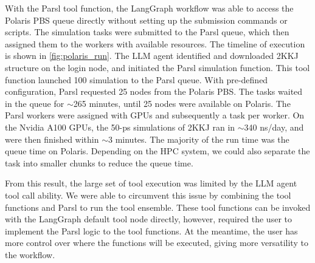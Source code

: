 With the Parsl tool function, the LangGraph workflow was able to access the Polaris PBS queue directly without setting up the submission commands or scripts. 
The simulation tasks were submitted to the Parsl queue, which then assigned them to the workers with available resources.
The timeline of execution is shown in \autoref{fig:polaris_run}. 
The LLM agent identified and downloaded 2KKJ structure on the login node, and initiated the Parsl simulation function. 
This tool function launched 100 simulation to the Parsl queue. 
With pre-defined configuration, Parsl requested 25 nodes from the Polaris PBS. 
The tasks waited in the queue for $\sim$265 minutes, until 25 nodes were available on Polaris. 
The Parsl workers were assigned with GPUs and subsequently a task per worker. 
On the Nvidia A100 GPUs, the 50-ps simulations of 2KKJ ran in $\sim$340 ns/day, and were then finished  within $\sim$3 minutes. 
The majority of the run time was the queue time on Polaris. 
Depending on the HPC system, we could also separate the task into smaller chunks to reduce the queue time. 

From this result, the large set of tool execution was limited by the LLM agent tool call ability. 
We were able to circumvent this issue by combining the tool functions and Parsl to run the tool ensemble. 
These tool functions can be invoked with the LangGraph default tool node directly, however, required the user to implement the Parsl logic to the tool functions. 
At the meantime, the user has more control over where the functions will be executed, giving more versatility to the workflow. 


